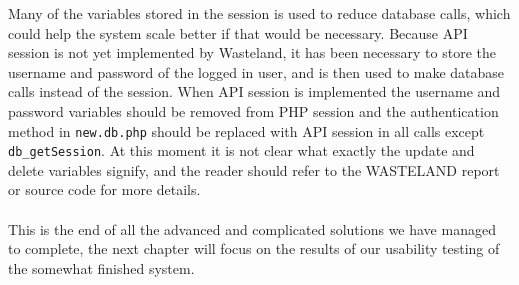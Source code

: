 Many of the variables stored in the session is used to reduce database calls, which could help the system scale better if that would be necessary. Because API session is not yet implemented by Wasteland, it has been necessary to store the username and password of the logged in user, and is then used to make database calls instead of the session. When API session is implemented the username and password variables should be removed from PHP session and the authentication method in \texttt{new.db.php} should be replaced with API session in all calls except \texttt{db\_getSession}. At this moment it is not clear what exactly the update and delete variables signify, and the reader should refer to the WASTELAND report or source code for more details.\\
\\
This is the end of all the advanced and complicated solutions we have managed to complete, the next chapter will focus on the results of our usability testing of the somewhat finished system.